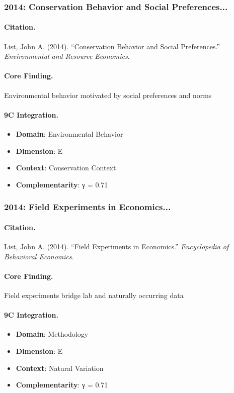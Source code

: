 \subsubsection{2014: Conservation Behavior and Social Preferences...}

\paragraph{Citation.}
List, John A. (2014). ``Conservation Behavior and Social Preferences.''
\textit{Environmental and Resource Economics}.

\paragraph{Core Finding.}
Environmental behavior motivated by social preferences and norms

\paragraph{9C Integration.}
\begin{itemize}[nosep]
  \item \textbf{Domain}: Environmental Behavior
  \item \textbf{Dimension}: E
  \item \textbf{Context}: Conservation Context
  \item \textbf{Complementarity}: γ = 0.71
\end{itemize}


\subsubsection{2014: Field Experiments in Economics...}

\paragraph{Citation.}
List, John A. (2014). ``Field Experiments in Economics.''
\textit{Encyclopedia of Behavioral Economics}.

\paragraph{Core Finding.}
Field experiments bridge lab and naturally occurring data

\paragraph{9C Integration.}
\begin{itemize}[nosep]
  \item \textbf{Domain}: Methodology
  \item \textbf{Dimension}: E
  \item \textbf{Context}: Natural Variation
  \item \textbf{Complementarity}: γ = 0.71
\end{itemize}


